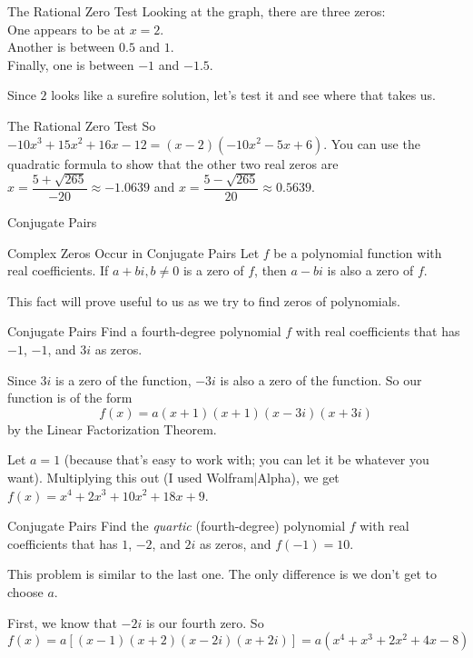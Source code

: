 \documentclass[t]{beamer}
\newcommand{\fp}[1]{\left({#1}\right)} %
\newcommand{\fb}[1]{\left[{#1}\right]} %
\begin{document}
	\begin{frame}{The Rational Zero Test}
		Looking at the graph, there are three zeros: \pause \\
		One appears to be at $x = 2$. \pause \\
		Another is between $0.5$ and $1$. \pause \\
		Finally, one is between $-1$ and $-1.5$. \pause
		
		Since $2$ looks like a surefire solution, let's test it and see where that takes us. \pause
		
		 \pause
	\end{frame}

	\begin{frame}{The Rational Zero Test}
		So $-10x^3 + 15x^2 + 16x - 12 = (x-2)(-10x^2 - 5x + 6)$. You can use the quadratic formula to show that the other two real zeros are $x = \dfrac{5 + \sqrt{265}}{-20} \approx -1.0639$ and $x = \dfrac{5 - \sqrt{265}}{20} \approx 0.5639$.
	\end{frame}

	\begin{frame}{Conjugate Pairs}
		\begin{block}{Complex Zeros Occur in Conjugate Pairs}
			Let $f$ be a polynomial function with real coefficients. If $a + bi, b\neq 0$ is a zero of $f$, then $a - bi$ is also a zero of $f$.
		\end{block}
	
		This fact will prove useful to us as we try to find zeros of polynomials.
	\end{frame}

	\begin{frame}{Conjugate Pairs}
		Find a fourth-degree polynomial $f$ with real coefficients that has $-1$, $-1$, and $3i$ as zeros. \pause
		
		Since $3i$ is a zero of the function, $-3i$ is also a zero of the function. So our function is of the form $$f(x) = a(x+1)(x+1)(x-3i)(x+3i)$$ by the Linear Factorization Theorem. \pause
		
		Let $a = 1$ (because that's easy to work with; you can let it be whatever you want). Multiplying this out (I used Wolfram|Alpha), we get $f(x) = x^4 + 2x^3 + 10x^2 + 18x + 9$.
	\end{frame}

	\begin{frame}{Conjugate Pairs}
		Find the \textit{quartic} (fourth-degree) polynomial $f$ with real coefficients that has $1$, $-2$, and $2i$ as zeros, and $f(-1) = 10$. \pause
		
		This problem is similar to the last one. The only difference is we don't get to choose $a$. \pause
		
		First, we know that $-2i$ is our fourth zero. So $$f(x) = a\fb{(x-1)(x+2)(x-2i)(x+2i)} = a\fp{x^4 + x^3 + 2x^2 + 4x - 8}$$
	\end{frame}
\end{document}
